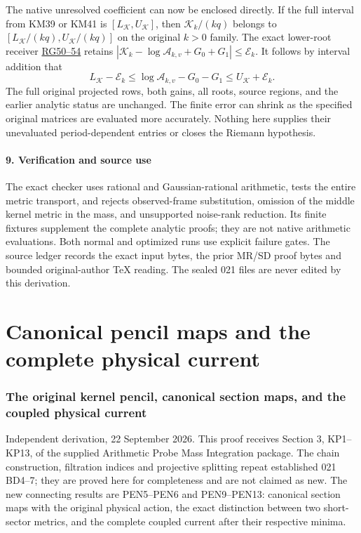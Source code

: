 \documentclass[11pt]{article}
\begin{document}
The native unresolved coefficient can now be enclosed directly. If the full interval from KM39 or KM41 is \([L_{\mathcal K},U_{\mathcal K}]\), then \(\mathcal K_k/(kq)\) belongs to \([L_{\mathcal K}/(kq),U_{\mathcal K}/(kq)]\) on the original \(k>0\) family. The exact lower-root receiver \href{https://github.com/KokunoYumeto/zeta-function-research-reader/blob/13ca9b136fcdae48df7454bd9bf99e1ef22dd03c/workbenches/splitzero-tandem/continuations/20260922-original-growth-resolvent/GROWTH_PROOFS.md}{RG50--54} retains \(|\mathcal K_k-\log\mathcal A_{k,v}+G_0+G_1|\le\mathcal E_k\). It follows by interval addition that \[
 L_{\mathcal K}-\mathcal E_k
 \le\log\mathcal A_{k,v}-G_0-G_1
 \le U_{\mathcal K}+\mathcal E_k.
 \tag{KM45}
\] The full original projected rows, both gains, all roots, source regions, and the earlier analytic status are unchanged. The finite error can shrink as the specified original matrices are evaluated more accurately. Nothing here supplies their unevaluated period-dependent entries or closes the Riemann hypothesis.

\subsection{9. Verification and source use}\label{verification-and-source-use}

The exact checker uses rational and Gaussian-rational arithmetic, tests the entire metric transport, and rejects observed-frame substitution, omission of the middle kernel metric in the mass, and unsupported noise-rank reduction. Its finite fixtures supplement the complete analytic proofs; they are not native arithmetic evaluations. Both normal and optimized runs use explicit failure gates. The source ledger records the exact input bytes, the prior MR/SD proof bytes and bounded original-author TeX reading. The sealed 021 files are never edited by this derivation.

\clearpage\part{Canonical pencil maps and the complete physical current}
\section{The original kernel pencil, canonical section maps, and the coupled physical current}\label{the-original-kernel-pencil-canonical-section-maps-and-the-coupled-physical-current}

Independent derivation, 22 September 2026. This proof receives Section 3, KP1--KP13, of the supplied Arithmetic Probe Mass Integration package. The chain construction, filtration indices and projective splitting repeat established 021 BD4--7; they are proved here for completeness and are not claimed as new. The new connecting results are PEN5--PEN6 and PEN9--PEN13: canonical section maps with the original physical action, the exact distinction between two short-sector metrics, and the complete coupled current after their respective minima.
\end{document}
